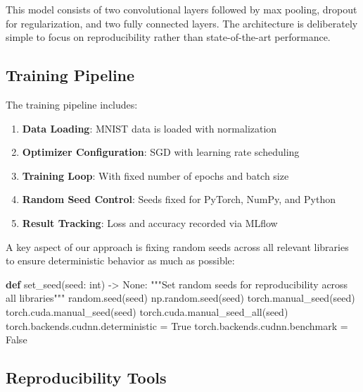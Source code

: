 \documentclass[
]{article}
\newenvironment{Shaded}{\begin{snugshade}}{\end{snugshade}}
\newcommand{\BuiltInTok}[1]{\textcolor[rgb]{0.00,0.23,0.31}{#1}}
\newcommand{\CommentTok}[1]{\textcolor[rgb]{0.37,0.37,0.37}{#1}}
\newcommand{\KeywordTok}[1]{\textcolor[rgb]{0.00,0.23,0.31}{\textbf{#1}}}
\newcommand{\NormalTok}[1]{\textcolor[rgb]{0.00,0.23,0.31}{#1}}
\newcommand{\OperatorTok}[1]{\textcolor[rgb]{0.37,0.37,0.37}{#1}}
\newcommand{\VariableTok}[1]{\textcolor[rgb]{0.07,0.07,0.07}{#1}}
\providecommand{\tightlist}{%
  \setlength{\itemsep}{0pt}\setlength{\parskip}{0pt}}\usepackage{longtable,booktabs,array}
\begin{document}
This model consists of two convolutional layers followed by max pooling,
dropout for regularization, and two fully connected layers. The
architecture is deliberately simple to focus on reproducibility rather
than state-of-the-art performance.

\subsection{Training Pipeline}\label{training-pipeline}

The training pipeline includes:

\begin{enumerate}
\def\labelenumi{\arabic{enumi}.}
\tightlist
\item
  \textbf{Data Loading}: MNIST data is loaded with normalization
\item
  \textbf{Optimizer Configuration}: SGD with learning rate scheduling
\item
  \textbf{Training Loop}: With fixed number of epochs and batch size
\item
  \textbf{Random Seed Control}: Seeds fixed for PyTorch, NumPy, and
  Python
\item
  \textbf{Result Tracking}: Loss and accuracy recorded via MLflow
\end{enumerate}

A key aspect of our approach is fixing random seeds across all relevant
libraries to ensure deterministic behavior as much as possible:

\begin{Shaded}
\begin{Highlighting}[]
\KeywordTok{def}\NormalTok{ set\_seed(seed: }\BuiltInTok{int}\NormalTok{) }\OperatorTok{{-}\textgreater{}} \VariableTok{None}\NormalTok{:}
    \CommentTok{"""Set random seeds for reproducibility across all libraries"""}
\NormalTok{    random.seed(seed)}
\NormalTok{    np.random.seed(seed)}
\NormalTok{    torch.manual\_seed(seed)}
\NormalTok{    torch.cuda.manual\_seed(seed)}
\NormalTok{    torch.cuda.manual\_seed\_all(seed)}
\NormalTok{    torch.backends.cudnn.deterministic }\OperatorTok{=} \VariableTok{True}
\NormalTok{    torch.backends.cudnn.benchmark }\OperatorTok{=} \VariableTok{False}
\end{Highlighting}
\end{Shaded}

\subsection{Reproducibility Tools}\label{reproducibility-tools}
\end{document}
